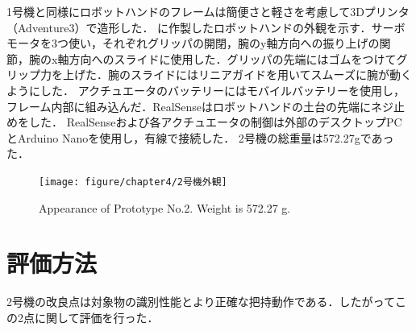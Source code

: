 1号機と同様にロボットハンドのフレームは簡便さと軽さを考慮して3Dプリンタ（Adventure3）で造形した．
に作製したロボットハンドの外観を示す．サーボモータを3つ使い，それぞれグリッパの開閉，腕のy軸方向への振り上げの関節，腕のx軸方向へのスライドに使用した．グリッパの先端にはゴムをつけてグリップ力を上げた．腕のスライドにはリニアガイドを用いてスムーズに腕が動くようにした．
アクチュエータのバッテリーにはモバイルバッテリーを使用し，フレーム内部に組み込んだ．RealSenseはロボットハンドの土台の先端にネジ止めをした．
RealSenseおよび各アクチュエータの制御は外部のデスクトップPCとArduino Nanoを使用し，有線で接続した．
2号機の総重量は572.27gであった．

\begin{figure}[H]
    \centering
    \texttt{[image: figure/chapter4/2号機外観]}
    \caption{Appearance of Prototype No.2. Weight is 572.27 g.}
    \label{fig:2号機外観}
\end{figure}


\section{評価方法}
2号機の改良点は対象物の識別性能とより正確な把持動作である．したがってこの2点に関して評価を行った．

